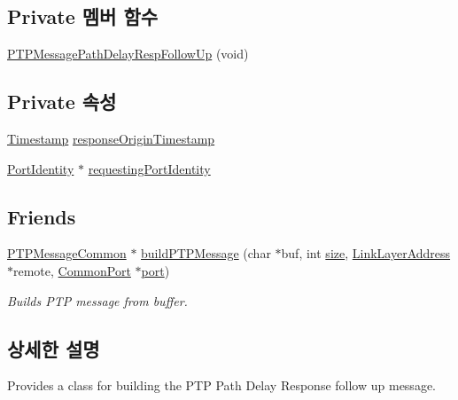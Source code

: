 \subsection*{Private 멤버 함수}
\begin{DoxyCompactItemize}
\item 
\hyperlink{class_p_t_p_message_path_delay_resp_follow_up_a7cb7ccac2ccd9bcc0174d78f910566bb}{P\+T\+P\+Message\+Path\+Delay\+Resp\+Follow\+Up} (void)
\end{DoxyCompactItemize}
\subsection*{Private 속성}
\begin{DoxyCompactItemize}
\item 
\hyperlink{class_timestamp}{Timestamp} \hyperlink{class_p_t_p_message_path_delay_resp_follow_up_ace95ddb3f03eb3b4fcf8f73281dc0ee3}{response\+Origin\+Timestamp}
\item 
\hyperlink{class_port_identity}{Port\+Identity} $\ast$ \hyperlink{class_p_t_p_message_path_delay_resp_follow_up_a27e69c7fb521ebffca13229a7c4658ce}{requesting\+Port\+Identity}
\end{DoxyCompactItemize}
\subsection*{Friends}
\begin{DoxyCompactItemize}
\item 
\hyperlink{class_p_t_p_message_common}{P\+T\+P\+Message\+Common} $\ast$ \hyperlink{class_p_t_p_message_path_delay_resp_follow_up_a3f587ce328a50a9f7af19f9822579d0d}{build\+P\+T\+P\+Message} (char $\ast$buf, int \hyperlink{gst__avb__playbin_8c_a439227feff9d7f55384e8780cfc2eb82}{size}, \hyperlink{class_link_layer_address}{Link\+Layer\+Address} $\ast$remote, \hyperlink{class_common_port}{Common\+Port} $\ast$\hyperlink{gst__avb__playbin_8c_a63c89c04d1feae07ca35558055155ffb}{port})
\begin{DoxyCompactList}\small\item\em Builds P\+TP message from buffer. \end{DoxyCompactList}\end{DoxyCompactItemize}


\subsection{상세한 설명}
Provides a class for building the P\+TP Path Delay Response follow up message. 

